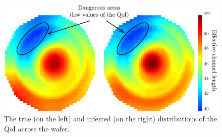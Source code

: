 \begin{figure}[b!]
  \vspace{-1.5em}
  \centering
  \includegraphics[width=1\linewidth]{include/figures/wafer-qoi.pdf}
  \caption{The true (on the left) and inferred (on the right) distributions of the QoI across the wafer.}
\end{figure}
